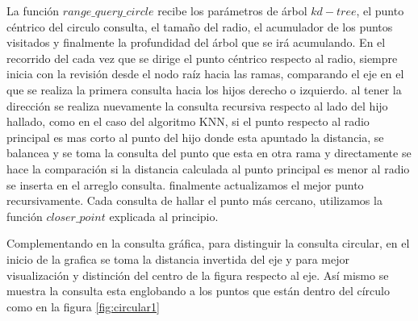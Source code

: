 \documentclass{article}
\begin{document}
    		
    		
    		La función $range\_query\_circle$ recibe los parámetros de árbol $kd-tree$, el punto céntrico del circulo consulta, el tamaño del radio, el acumulador de los puntos visitados y finalmente la profundidad del árbol que se irá acumulando. En el recorrido del cada vez que se dirige el punto céntrico respecto al radio, siempre inicia con la revisión desde el nodo raíz hacia las ramas, comparando el eje en el que se realiza la primera consulta hacia los hijos derecho o izquierdo. al tener la dirección se realiza nuevamente la consulta recursiva respecto al lado del hijo hallado, como en el caso del algoritmo KNN, si el punto respecto al radio principal es mas corto al punto del hijo donde esta apuntado la distancia, se balancea y se toma la consulta del punto que esta en otra rama y directamente se hace la comparación si la distancia calculada al punto principal es menor al radio se inserta en el arreglo consulta. finalmente actualizamos el mejor punto recursivamente. Cada consulta de hallar el punto más cercano, utilizamos la función  $closer\_point$ explicada al principio.
    		
    		
    		
    		Complementando en la consulta gráfica, para distinguir la consulta circular, en el inicio de la grafica se toma la distancia invertida del eje y para mejor visualización y distinción del centro de la figura respecto al eje. Así mismo se muestra la consulta esta englobando a los puntos que están dentro del círculo como en la figura \ref{fig:circular1}
    		
\end{document}
